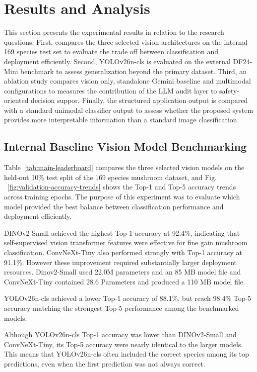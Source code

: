 \documentclass[journal,transmag]{IEEEtran}
\begin{document}
 
\section{\textbf{Results and Analysis}}
 
This section presents the experimental results in relation to the research questions. First, compares the three selected vision architectures on the internal 169 species test set to evaluate the trade off between classification and deployment efficiently. Second, YOLOv26n-cls is evaluated on the external DF24-Mini benchmark to assess generalization beyond the primary dataset. Third, an ablation study compares vision only, standalone Gemini baseline and multimodal configurations to measures the contribution of the LLM audit layer to safety-oriented decision suppor. Finally, the structured application output is compared with a standard unimodal classifier output to assess whether the proposed system provides more interpretable information than a standard image classification.
 

\subsection{\textbf{Internal Baseline Vision Model Benchmarking}}\label{subsec:baseline}
 
Table~\ref{tab:main-leaderboard} compares the three selected vision models on the held-out 10\% test split of the 169 species mushroom dataset, and Fig. ~\ref{fig:validation-accuracy-trends} shows the Top-1 and Top-5 accuracy trends across training epochs. The purpose of this experiment was to evaluate which model provided the best balance between classification performance and deployment efficiently. 

DINOv2-Small achieved the highest Top-1 accuracy at 92.4\%, indicating that self-supervised vision transformer features were effective for fine gain mushroom classification. ConvNeXt-Tiny also performed strongly with Top-1 accuracy at 91.1\%. However these improvement required substantially larger deployment resources. Dinov2-Small used 22.0M parameters and an 85 MB model file and ConvNeXt-Tiny contained 28.6 Parameters and produced a 110 MB model file.

YOLOv26n-cls achieved a lower Top-1 accuracy of 88.1\%, but reach 98.4\% Top-5 accuracy matching the strongest Top-5 performance among the benchmarked models. 

Although YOLOv26n-cls Top-1 accuracy was lower than  DINOv2-Small and ConvNeXt-Tiny, its Top-5 accuracy were nearly identical to the larger models. This means that YOLOv26n-cls often included the correct species among its top predictions, even when the first prediction was not always correct. 
\end{document}
